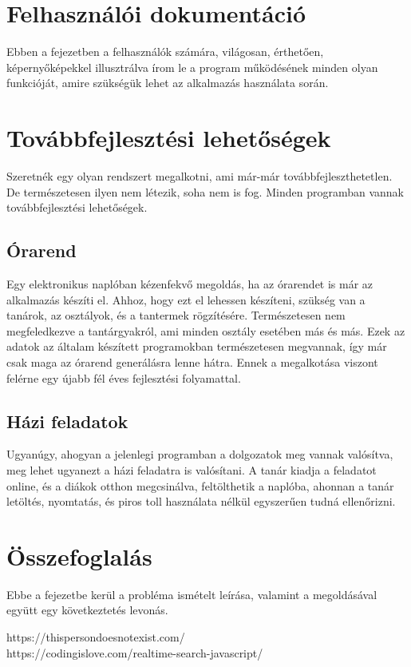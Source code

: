 \documentclass[
]{thesis-ekf}
\begin{document}
\chapter{Felhasználói dokumentáció}
Ebben a fejezetben a felhasználók számára, világosan, érthetően, képernyőképekkel illusztrálva írom le a program működésének minden olyan funkcióját, amire szükségük lehet az alkalmazás használata során.
\chapter{Továbbfejlesztési lehetőségek}
Szeretnék egy olyan rendszert megalkotni, ami már-már továbbfejleszthetetlen. De természetesen ilyen nem létezik, soha nem is fog. Minden programban vannak továbbfejlesztési lehetőségek.
\section{Órarend}
Egy elektronikus naplóban kézenfekvő megoldás, ha az órarendet is már az alkalmazás készíti el. Ahhoz, hogy ezt el lehessen készíteni, szükség van a tanárok, az osztályok, és a tantermek rögzítésére. Természetesen nem megfeledkezve a tantárgyakról, ami minden osztály esetében más és más. Ezek az adatok az általam készített programokban természetesen megvannak, így már csak maga az órarend generálásra lenne hátra. Ennek a megalkotása viszont felérne egy újabb fél éves fejlesztési folyamattal.
\section{Házi feladatok}
Ugyanúgy, ahogyan a jelenlegi programban a dolgozatok meg vannak valósítva, meg lehet ugyanezt a házi feladatra is valósítani. A  tanár kiadja a feladatot online, és a diákok otthon megcsinálva, feltölthetik a naplóba, ahonnan a tanár letöltés, nyomtatás, és piros toll használata nélkül egyszerűen tudná ellenőrizni. 
\chapter{Összefoglalás}
Ebbe a fejezetbe kerül a probléma ismételt leírása, valamint a megoldásával együtt egy következtetés levonás.
\begin{thebibliography}{}
	https://thispersondoesnotexist.com/ \\
	https://codingislove.com/realtime-search-javascript/
\end{thebibliography}
\end{document}
